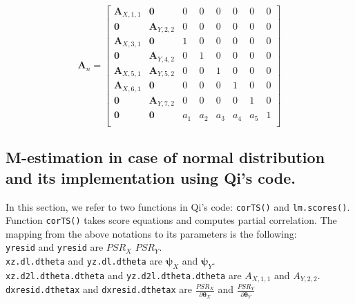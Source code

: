 \documentclass[]{article}
\begin{document}
\[
\pmb{A}_n = \begin{bmatrix}
    \pmb{A}_{X,1,1}   &    \pmb{0}     &    0     &     0 & 0 & 0 & 0 & 0\\
            \pmb{0}   &     \pmb{A}_{Y,2,2}     &    0     &     0 & 0 & 0 & 0 & 0\\
          \pmb{A}_{X, 3,1}   &     \pmb{0}     &    1     &     0 & 0 & 0 & 0 & 0\\
            \pmb{0}   & \pmb{A}_{Y, 4,2} &    0     &     1 & 0 & 0 & 0 & 0\\
            \pmb{A}_{X,5,1}   &     \pmb{A}_{Y,5,2}     & 0 &    0 & 1 & 0 & 0 & 0\\
          \pmb{A}_{X, 6,1}   &     \pmb{0}     &    0     &     0 & 0 & 1 & 0 & 0\\
            \pmb{0}   & \pmb{A}_{Y, 7,2} &    0     &     0 & 0 & 0 & 1 & 0\\
            \pmb{0}   & \pmb{0} &    a_1 & a_2 &  a_3 & a_4 & a_5 & 1\\
\end{bmatrix}
\]

\subsection{M-estimation in case of normal distribution and its implementation using Qi's code.}
In this section, we refer to two functions in Qi's code: \texttt{corTS()} and \texttt{lm.scores()}. Function  \texttt{corTS()} takes score equations and computes partial correlation. The mapping from the above notations to its parameters is the following:\\
\texttt{yresid} and \texttt{yresid} are $PSR_X$ $PSR_Y$.\\
\texttt{xz.dl.dtheta} and \texttt{yz.dl.dtheta} are $\pmb{\psi}_{X}$ and $\pmb{\psi}_{Y}$.\\
\texttt{xz.d2l.dtheta.dtheta} and \texttt{yz.d2l.dtheta.dtheta} are $A_{X,1,1}$ and $A_{Y,2,2}$.\\
\texttt{dxresid.dthetax} and \texttt{dxresid.dthetax} are $\frac{PSR_X}{\partial \pmb{\theta}_X}$ and $\frac{PSR_Y}{\partial \pmb{\theta}_Y}$\\
\end{document}
